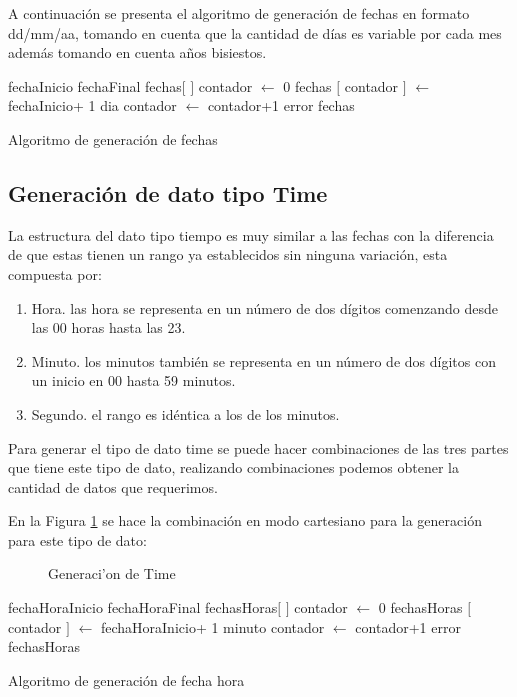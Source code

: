 A continuaci\'on se presenta el algoritmo de generaci\'on de fechas en formato dd/mm/aa, tomando en cuenta que la cantidad de d\'ias es variable por cada mes adem\'as tomando en cuenta a\~nos bisiestos.
\begin{algorithm}[H]
\begin{algorithmic}[1]
\REQUIRE fechaInicio fechaFinal
\STATE fechas$[$ $]$
\STATE contador $\leftarrow$ 0
	\STATE fechas $[$ contador $]$ $\leftarrow$ fechaInicio+ 1 dia
	\STATE contador $\leftarrow$ contador+1
	\ENDWHILE
\ELSE
	\RETURN error
\ENDIF
\RETURN fechas
\end{algorithmic}
\caption{Algoritmo de generaci\'on de fechas}\label{alg:algoritmoGeneracionFechas}
\end{algorithm}
\subsection{Generaci\'on de dato tipo Time}
La estructura del dato tipo tiempo es muy similar a las fechas con la diferencia de que estas tienen un rango ya establecidos sin ninguna variaci\'on, esta compuesta por:
\begin{enumerate}
\item Hora. las hora se representa en un n\'umero de dos d\'igitos comenzando desde las 00 horas hasta las 23.
\item Minuto. los minutos tambi\'en se representa en un n\'umero de dos d\'igitos con un inicio en 00 hasta 59 minutos.
\item Segundo. el rango es id\'entica a los de los minutos.
\end{enumerate}
Para generar el tipo de dato time se puede hacer combinaciones de las tres partes que tiene este tipo de dato, realizando combinaciones podemos obtener la cantidad de datos que requerimos.

En la Figura \ref{fig:generacion de Time} se hace la combinaci\'on en modo cartesiano para la generaci\'on para este tipo de dato:

\begin{figure}[H]
\centering
{}
\caption{Generaci'on de Time} \label{fig:generacion de Time}
\end{figure}
\begin{algorithm}[H]
\begin{algorithmic}[1]
\REQUIRE fechaHoraInicio fechaHoraFinal
\STATE fechasHoras$[$ $]$
\STATE contador $\leftarrow$ 0
	\STATE fechasHoras $[$ contador $]$ $\leftarrow$ fechaHoraInicio+ 1 minuto
	\STATE contador $\leftarrow$ contador+1
	\ENDWHILE
\ELSE
	\RETURN error
\ENDIF
\RETURN fechasHoras
\end{algorithmic}
\caption{Algoritmo de generaci\'on de fecha hora}\label{alg:algoritmoGeneracionDateTime}
\end{algorithm}

